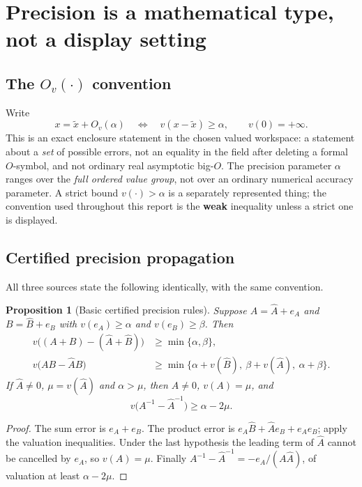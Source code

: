 \documentclass[11pt,letterpaper]{article}
\numberwithin{equation}{section}
\newtheorem{proposition}[theorem]{Proposition}
\theoremstyle{definition}
\theoremstyle{remark}
\newcommand{\Ov}[1]{O_v(#1)}
\begin{document}
\section{Precision is a mathematical type, not a display setting}
\label{cas:sec-precision}

\subsection{The \texorpdfstring{$\Ov{\cdot}$}{O\_v} convention}
\label{cas:sub-ovconvention}
Write
\[
 x=\widetilde x+\Ov{\alpha}
 \quad\Longleftrightarrow\quad
 v(x-\widetilde x)\ge\alpha,\qquad v(0)=+\infty .
\]
This is an exact enclosure statement in the chosen valued workspace: a statement
about a \emph{set} of possible errors, not an equality in the field after
deleting a formal $O$-symbol, and not ordinary real asymptotic big-$O$. The
precision parameter $\alpha$ ranges over the \emph{full ordered value group},
not over an ordinary numerical accuracy parameter. A strict bound
$v(\cdot)>\alpha$ is a separately represented thing; the convention used
throughout this report is the \textbf{weak} inequality unless a strict one is
displayed.

\subsection{Certified precision propagation}
\label{cas:sub-precisionrules}
All three sources state the following identically, with the same convention.

\begin{proposition}[Basic certified precision rules]\label{cas:prop-precision}
Suppose $A=\widehat A+e_A$ and $B=\widehat B+e_B$ with $v(e_A)\ge\alpha$ and
$v(e_B)\ge\beta$. Then
\begin{align}
 v\bigl((A+B)-(\widehat A+\widehat B)\bigr)&\ge\min\{\alpha,\beta\},
 \label{cas:eq-addprecision}\\
 v\bigl(AB-\widehat A\widehat B\bigr)&\ge
 \min\{\alpha+v(\widehat B),\ \beta+v(\widehat A),\ \alpha+\beta\}.
 \label{cas:eq-mulprecision}
\end{align}
If $\widehat A\ne0$, $\mu=v(\widehat A)$ and $\alpha>\mu$, then $A\ne0$,
$v(A)=\mu$, and
\begin{equation}\label{cas:eq-invprecision}
 v\bigl(A^{-1}-\widehat A^{-1}\bigr)\ge\alpha-2\mu .
\end{equation}
\end{proposition}
\begin{proof}
The sum error is $e_A+e_B$. The product error is
$e_A\widehat B+\widehat Ae_B+e_Ae_B$; apply the valuation inequalities. Under
the last hypothesis the leading term of $\widehat A$ cannot be cancelled by
$e_A$, so $v(A)=\mu$. Finally
$A^{-1}-\widehat A^{-1}=-e_A/(A\widehat A)$, of valuation at least
$\alpha-2\mu$.
\end{proof}
\end{document}
